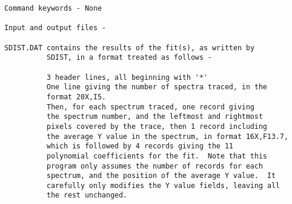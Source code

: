 \begin{description}
\begin{verbatim}
 Command keywords - None

 Input and output files -

 SDIST.DAT contains the results of the fit(s), as written by
           SDIST, in a format treated as follows -

           3 header lines, all beginning with '*'
           One line giving the number of spectra traced, in the
           format 20X,I5.
           Then, for each spectrum traced, one record giving
           the spectrum number, and the leftmost and rightmost
           pixels covered by the trace, then 1 record including
           the average Y value in the spectrum, in format 16X,F13.7,
           which is followed by 4 records giving the 11
           polynomial coefficients for the fit.  Note that this
           program only assumes the number of records for each
           spectrum, and the position of the average Y value.  It
           carefully only modifies the Y value fields, leaving all
           the rest unchanged.
\end{verbatim}
\end{description}
